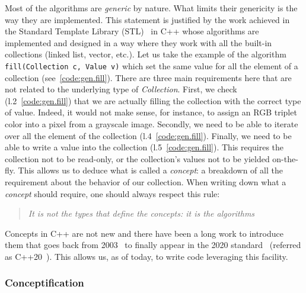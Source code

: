 Most of the algorithms are \emph{generic} by nature. What limits their genericity is the way they are implemented. This
statement is justified by the work achieved in the Standard Template Library (STL)~\parencite{dehnert.1998.fundamentals}
in C++ whose algorithms are implemented and designed in a way where they work with all the built-in collections (linked
list, vector, etc.). Let us take the example of the algorithm \texttt{fill(Collection c, Value v)} which set the same
value for all the element of a collection (see~\cref{code:gen.fill}). There are three main requirements here that are
not related to the underlying type of \emph{Collection}. First, we check (l.2~\ref{code:gen.fill}) that we are actually
filling the collection with the correct type of value. Indeed, it would not make sense, for instance, to assign an RGB
triplet color into a pixel from a grayscale image. Secondly, we need to be able to iterate over all the element of the
collection (l.4~\ref{code:gen.fill}). Finally, we need to be able to write a value into the collection
(l.5~\ref{code:gen.fill}). This requires the collection not to be read-only, or the collection's values not to be
yielded on-the-fly. This allows us to deduce what is called a \emph{concept}: a breakdown of all the requirement about
the behavior of our collection. When writing down what a \emph{concept} should require, one should always respect this
rule: \blockquote{\emph{It is not the types that define the concepts: it is the algorithms}}. Concepts in C++ are not
new and there have been a long work to introduce them that goes back from
2003~\parencite{seymour.2009.concepts,stroustrup.2003.concepts,sutton.2017.concepts} to finally appear in the 2020
standard~\parencite{voutilainen.2017.concepts} (referred as C++20~\parencite{iso.2011.cpp}). This allows us, as of
today, to write code leveraging this facility.

\subsubsection{Conceptification}
\label{subsec:conceptification}

